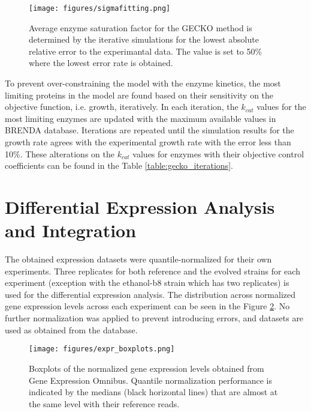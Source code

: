 \begin{figure}[H]
  \begin{center}
    \texttt{[image: figures/sigmafitting.png]}
    \caption[Average enzyme saturation factor for the GECKO method is determined by the iterative simulations for the lowest absolute relative error to the experimantal data]{Average enzyme saturation factor for the GECKO method is determined by the iterative simulations for the lowest absolute relative error to the experimantal data. The value is set to 50\% where the lowest error rate is obtained.}
    \label{fig:sigma_fitting}
  \end{center}
\end{figure}

To prevent over-constraining the model with the enzyme kinetics, the most limiting proteins in the model are found based on their sensitivity on the objective function, i.e. growth, iteratively. In each iteration, the $k_{cat}$ values for the most limiting enzymes are updated with the maximum available values in BRENDA\cite{jeske2019brenda} database. Iterations are repeated until the simulation results for the growth rate agrees with the experimental growth rate with the error less than 10\%. These alterations on the $k_{cat}$ values for enzymes with their objective control coefficients can be found in the Table \ref{table:gecko_iterations}.



\vspace{-0.5cm}
\section{Differential Expression Analysis and Integration}

The obtained expression datasets were quantile-normalized for their own experiments. Three replicates for both reference and the evolved strains for each experiment (exception with the ethanol-b8 strain which has two replicates) is used for the differential expression analysis. The distribution across normalized gene expression levels across each experiment can be seen in the Figure \ref{fig:expr_boxplot}. No further normalization was applied to prevent introducing errors, and datasets are used as obtained from the database.

\begin{figure}[H]
  \begin{center}
  \texttt{[image: figures/expr\_boxplots.png]}
  \caption[Boxplots of the normalized gene expression levels]{Boxplots of the normalized gene expression levels obtained from Gene Expression Omnibus. Quantile normalization performance is indicated by the medians (black horizontal lines) that are almost at the same level with their reference reads.}
  \label{fig:expr_boxplot}
  \end{center}
\end{figure}

